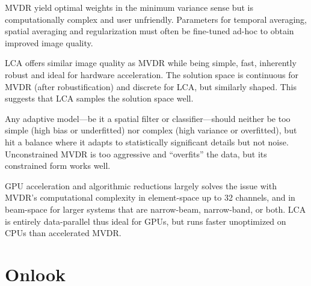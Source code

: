 MVDR yield optimal weights in the minimum variance sense but is computationally complex and user unfriendly. Parameters for temporal averaging, spatial averaging and regularization must often be fine-tuned ad-hoc to obtain improved image quality.

LCA offers similar image quality as MVDR while being simple, fast, inherently robust and ideal for hardware acceleration. The solution space is continuous for MVDR (after robustification) and discrete for LCA, but similarly shaped. This suggests that LCA samples the solution space well.

Any adaptive model---be it a spatial filter or classifier---should neither be too simple (high bias or underfitted) nor complex (high variance or overfitted), but hit a balance where it adapts to statistically significant details but not noise. Unconstrained MVDR is too aggressive and ``overfits'' the data, but its constrained form works well.




%

GPU acceleration and algorithmic reductions largely solves the issue with MVDR's computational complexity in element-space up to 32 channels, and in beam-space for larger systems that are narrow-beam, narrow-band, or both. LCA is entirely data-parallel thus ideal for GPUs, but runs faster unoptimized on CPUs than accelerated MVDR.%

%




\section{Onlook}


